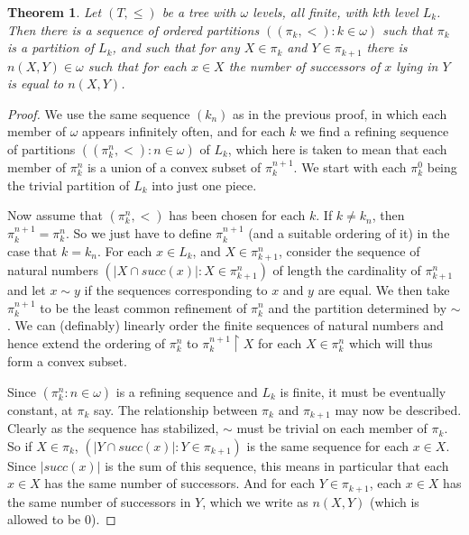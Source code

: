 \documentclass[a4paper,reqno]{amsart}
\numberwithin{equation}{section}
\newtheorem{theorem}{Theorem}[section]
\begin{document}
\begin{theorem} Let $(T, \le)$ be a tree with $\omega$ levels, all finite, with $k$th level $L_k$. 
Then there is a sequence of ordered partitions $((\pi_k, <): k \in \omega)$ such that $\pi_k$ is a partition
of $L_k$, and such that for any $X \in \pi_k$ and $Y \in \pi_{k+1}$ there is $n(X,Y) \in \omega$ such that for
each $x \in X$ the number of successors of $x$ lying in $Y$ is equal to $n(X,Y)$. \label{4.2}  \end{theorem}

\begin{proof} We use the same sequence $(k_n)$ as in the previous proof, in which each member of $\omega$ 
appears infinitely often, and for each $k$ we find a refining sequence of partitions 
$((\pi_k^n, <): n \in \omega)$ of $L_k$, which here is taken to mean that each member of $\pi_k^n$ is a 
union of a convex subset of $\pi_k^{n+1}$. We start with each $\pi_k^0$ 
being the trivial partition of $L_k$ into just one piece.

Now assume that $(\pi_k^n, <)$ has been chosen for each $k$. If $k \neq k_n$, then $\pi_k^{n+1} = \pi_k^n$.
So we just have to define $\pi_k^{n+1}$ (and a suitable ordering of it) in the case that $k = k_n$. For each
$x \in L_k$, and $X \in \pi^n_{k+1}$, consider the sequence of natural numbers $(|X \cap succ(x)|: X \in \pi^n_{k+1})$
of length the cardinality of $\pi^n_{k+1}$ and let $x \sim y$ if the sequences corresponding to $x$ and $y$ are equal.
We then take $\pi^{n+1}_k$ to be the least common refinement of $\pi^n_k$ and the partition determined by $\sim$. We
can (definably) linearly order the finite sequences of natural numbers and hence extend the ordering of $\pi^n_k$ to
$\pi^{n+1}_k \upharpoonright X$ for each $X \in \pi^n_k$ which will thus form a convex subset.

Since $(\pi^n_k: n \in \omega)$ is a refining sequence and $L_k$ is finite, it must be eventually constant, at $\pi_k$ 
say. The relationship between $\pi_k$ and $\pi_{k+1}$ may now be described. Clearly as the sequence has stabilized,
$\sim$ must be trivial on each member of $\pi_k$. So if $X \in \pi_k$, $(|Y \cap succ(x)|: Y \in \pi_{k+1})$ is the same
sequence for each $x \in X$. Since $|succ(x)|$ is the sum of this sequence, this means in particular that each $x \in X$ 
has the same number of successors. And for each $Y \in \pi_{k+1}$, each $x \in X$ has the same number of successors in $Y$,
which we write as $n(X,Y)$ (which is allowed to be 0).     \end{proof} 
\end{document}
